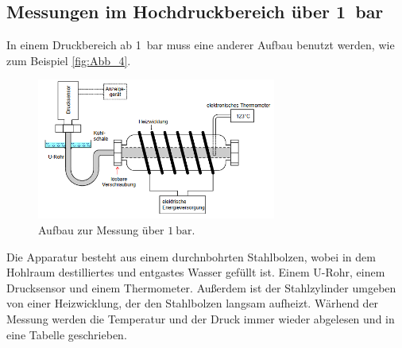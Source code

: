 \subsection{Messungen im Hochdruckbereich über \qty{1}{\bar}} %
\label{sub:M_Hochdruckbereich}
In einem Druckbereich ab \qty{1}{\bar} muss eine anderer Aufbau benutzt werden, wie zum Beispiel \autoref{fig:Abb_4}.
\begin{figure}[H]
    \centering
    \includegraphics[width=0.7\textwidth]{build/Abb_4.PNG}
    \caption {Aufbau zur Messung über $\qty{1}{\bar}$.\cite{v203}}
    \label{fig:Abb_4}
\end{figure}
Die Apparatur besteht aus einem durchnbohrten Stahlbolzen, wobei in dem Hohlraum destilliertes und entgastes Wasser gefüllt ist.
Einem U-Rohr, einem Drucksensor und einem Thermometer.
Außerdem ist der Stahlzylinder umgeben von einer Heizwicklung, der den Stahlbolzen langsam aufheizt.
Wärhend der Messung werden die Temperatur und der Druck immer wieder abgelesen und in eine Tabelle geschrieben.
